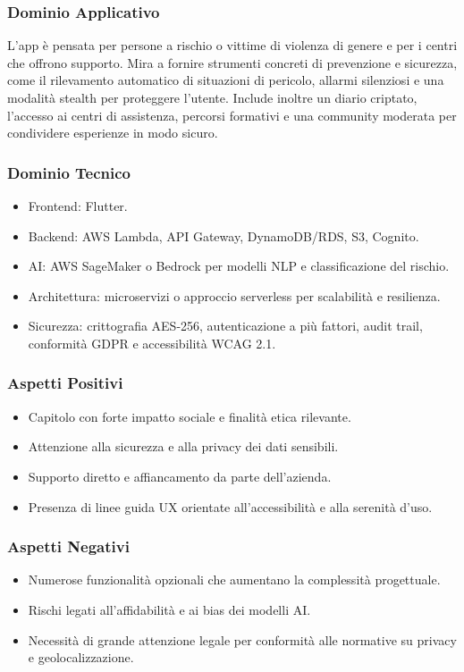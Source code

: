 \documentclass[a4paper,12pt]{article}
\begin{document}
\subsubsection*{Dominio Applicativo}
L’app è pensata per persone a rischio o vittime di violenza di genere e per i centri che offrono supporto.  
Mira a fornire strumenti concreti di prevenzione e sicurezza, come il rilevamento automatico di situazioni di pericolo, allarmi silenziosi e una modalità stealth per proteggere l’utente.  
Include inoltre un diario criptato, l’accesso ai centri di assistenza, percorsi formativi e una community moderata per condividere esperienze in modo sicuro.


\subsubsection*{Dominio Tecnico}
\begin{itemize}[leftmargin=*]
    \item Frontend: Flutter.
    \item Backend: AWS Lambda, API Gateway, DynamoDB/RDS, S3, Cognito.
    \item AI: AWS SageMaker o Bedrock per modelli NLP e classificazione del rischio.
    \item Architettura: microservizi o approccio serverless per scalabilità e resilienza.
    \item Sicurezza: crittografia AES-256, autenticazione a più fattori, audit trail, conformità GDPR e accessibilità WCAG 2.1.
\end{itemize}

\subsubsection*{Aspetti Positivi}
\begin{itemize}[leftmargin=*]
    \item Capitolo con forte impatto sociale e finalità etica rilevante.
    \item Attenzione alla sicurezza e alla privacy dei dati sensibili.
    \item Supporto diretto e affiancamento da parte dell’azienda.
    \item Presenza di linee guida UX orientate all’accessibilità e alla serenità d’uso.
\end{itemize}

\subsubsection*{Aspetti Negativi}
\begin{itemize}[leftmargin=*]
    \item Numerose funzionalità opzionali che aumentano la complessità progettuale.
    \item Rischi legati all’affidabilità e ai bias dei modelli AI.
    \item Necessità di grande attenzione legale per conformità alle normative su privacy e geolocalizzazione.
\end{itemize}
\end{document}
